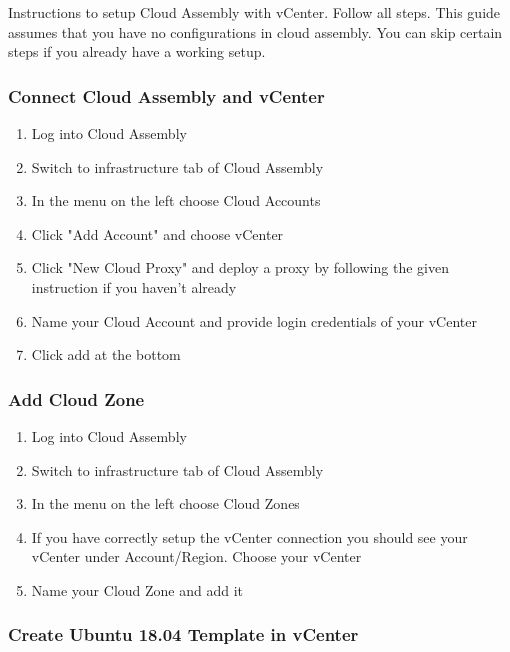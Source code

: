 \documentclass{article}
\begin{document}
Instructions to setup Cloud Assembly with vCenter. Follow all steps. This guide assumes that you have no configurations in cloud assembly. You can skip certain steps if you already have a working setup. 

\subsubsection{Connect Cloud Assembly and vCenter}
\begin{enumerate}
  \item Log into Cloud Assembly
  \item Switch to infrastructure tab of Cloud Assembly
  \item In the menu on the left choose Cloud Accounts
  \item Click "Add Account" and choose vCenter
  \item Click "New Cloud Proxy" and deploy a proxy by following the given instruction if you haven't already 
  \item Name your Cloud Account and provide login credentials of your vCenter
  \item Click add at the bottom
\end{enumerate}


\subsubsection{Add Cloud Zone}
\begin{enumerate}
  \item Log into Cloud Assembly
  \item Switch to infrastructure tab of Cloud Assembly
  \item In the menu on the left choose Cloud Zones
  \item If you have correctly setup the vCenter connection you should see your vCenter under Account/Region. Choose your vCenter
  \item Name your Cloud Zone and add it
\end{enumerate}

\subsubsection{Create Ubuntu 18.04 Template in vCenter}
\end{document}
